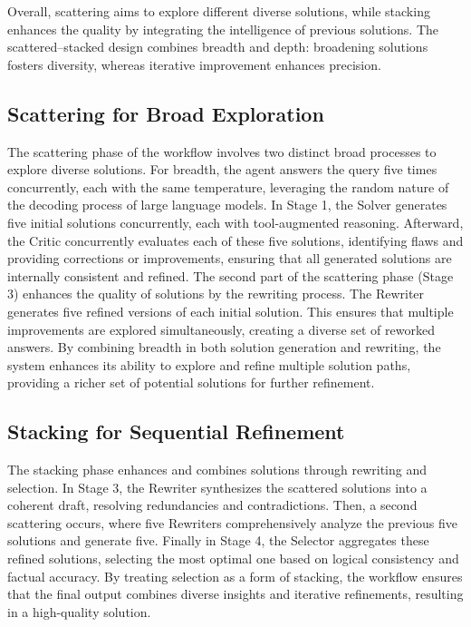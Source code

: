 \documentclass{article}
\begin{document}
Overall, scattering aims to explore different diverse solutions, while stacking enhances the quality by integrating the intelligence of previous solutions. 
The scattered–stacked design combines breadth and depth: broadening solutions fosters diversity, whereas iterative improvement enhances precision. 


\subsection{Scattering for Broad Exploration}
The scattering phase of the workflow involves two distinct broad processes to explore diverse solutions. For breadth, the agent answers the query five times concurrently, each with the same temperature, leveraging the random nature of the decoding process of large language models. In Stage 1, the Solver generates five initial solutions concurrently, each with tool-augmented reasoning. Afterward, the Critic concurrently evaluates each of these five solutions, identifying flaws and providing corrections or improvements, ensuring that all generated solutions are internally consistent and refined.
The second part of the scattering phase (Stage 3) enhances the quality of solutions by the rewriting process. The Rewriter generates five refined versions of each initial solution. This ensures that multiple improvements are explored simultaneously, creating a diverse set of reworked answers. By combining breadth in both solution generation and rewriting, the system enhances its ability to explore and refine multiple solution paths, providing a richer set of potential solutions for further refinement.

\subsection{Stacking for Sequential Refinement}
The stacking phase enhances and combines solutions through rewriting and selection. In Stage 3, the Rewriter synthesizes the scattered solutions into a coherent draft, resolving redundancies and contradictions. Then, a second scattering occurs, where five Rewriters comprehensively analyze the previous five solutions and generate five. Finally in Stage 4, the Selector aggregates these refined solutions, selecting the most optimal one based on logical consistency and factual accuracy. By treating selection as a form of stacking, the workflow ensures that the final output combines diverse insights and iterative refinements, resulting in a high-quality solution.
\end{document}
